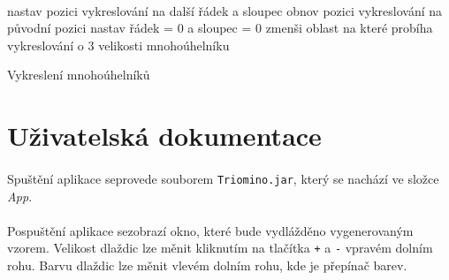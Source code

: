 \documentclass[12pt]{scrartcl}
\begin{document}
\paragraph{}
\begin{algorithm}[H]
	 {
		 {
			 {
				\BlankLine
				nastav pozici vykreslování na další řádek a sloupec
				\BlankLine
				\BlankLine
				obnov pozici vykreslování na původní pozici
				\BlankLine
			}
		}
		\BlankLine
			nastav řádek = 0 a sloupec = 0
		\BlankLine
		\BlankLine
			zmenši oblast na které probíha vykreslování o 3 velikosti mnohoúhelníku
		\BlankLine
	}
 \caption{Vykreslení mnohoúhelníků}
\end{algorithm}

\section{Uživatelská dokumentace}

\paragraph{}
Spuštění aplikace se\nobreakspace provede souborem \texttt{Triomino.jar}, který se nachází ve složce \emph{App}.

\paragraph{}
Po\nobreakspace spuštění aplikace se\nobreakspace zobrazí okno, které bude vydlážděno vygenerovaným vzorem. Velikost dlaždic lze měnit kliknutím na tlačítka \texttt{+} a \texttt{-} v\nobreakspace pravém dolním rohu. Barvu dlaždic lze měnit v\nobreakspace levém dolním rohu, kde je přepínač barev.	
\end{document}
